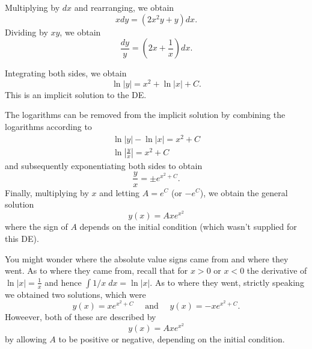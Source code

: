 \documentclass{book}
\begin{document}
\begin{solution}

  Multiplying by $dx$ and rearranging, we obtain
  \begin{equation*}
    x dy = (2 x^2 y + y) dx.
  \end{equation*}
  Dividing by $x y$, we obtain
  \begin{equation*}
    \frac{dy}{y} = \left(2 x + \frac{1}{x}\right) dx.
  \end{equation*}


  Integrating both sides, we obtain
  \begin{equation*}
    \ln |y| = x^2 + \ln|x| + C.
  \end{equation*}
  This is an implicit solution to the DE.


  The logarithms can be removed from the implicit solution by
  combining the logarithms according to
  \begin{gather*}
    \ln|y| - \ln|x| = x^2 + C \\
    \ln\left| \frac{y}{x} \right| = x^2 + C
  \end{gather*}
  and subsequently exponentiating both sides to obtain
  \begin{equation*}
    \frac{y}{x} = \pm e^{x^2 + C}.
  \end{equation*}
  Finally, multiplying by $x$ and letting $A = e^C$ (or $-e^C$), we
  obtain the general solution
  \begin{equation*}
    y(x) = A x e^{x^2}
  \end{equation*}
  where the sign of $A$ depends on the initial condition (which wasn't
  supplied for this DE).
\end{solution}

\begin{heads}
  You might wonder where the absolute value signs came from and where
  they went.  As to where they came from, recall that for $x>0$ or
  $x<0$ the derivative of $\ln|x| = \frac{1}{x}$ and hence $\int 1/x
  \;dx = \ln|x|$.  As to where they went, strictly speaking we
  obtained two solutions, which were
  \begin{equation*}
    y(x) = x e^{x^2 + C} \quad \text{ and } \quad y(x) = -x e^{x^2 + C}.
  \end{equation*}
  Howeever, both of these are described by
  \begin{equation*}
    y(x) = A x e^{x^2}
  \end{equation*}
  by allowing $A$ to be positive or negative, depending on the initial
  condition.
\end{heads}
\end{document}
